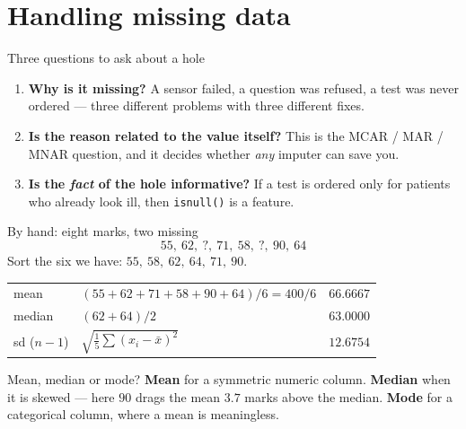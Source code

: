 \documentclass[aspectratio=169]{beamer}
\begin{document}
\section[Missing]{Handling missing data}
\label{sec:missing}

\begin{frame}[shrink=6]{Three questions to ask about a hole}
  \begin{enumerate}
    \item<1-> \textbf{Why is it missing?} A sensor failed, a question was
      refused, a test was never ordered --- three different problems with
      three different fixes.
    \item<2-> \textbf{Is the reason related to the value itself?} This is the
      MCAR / MAR / MNAR question, and it decides whether \emph{any} imputer
      can save you.
    \item<3-> \textbf{Is the \emph{fact} of the hole informative?} If a test
      is ordered only for patients who already look ill, then
      \texttt{isnull()} is a feature.
  \end{enumerate}
  \vspace{0.6em}
\end{frame}

\begin{frame}[shrink=8]{By hand: eight marks, two missing}
  \[
    55,\ 62,\ \boxed{?},\ 71,\ 58,\ \boxed{?},\ 90,\ 64
  \]
  Sort the six we have: $55,\ 58,\ 62,\ 64,\ 71,\ 90$.
  \begin{center}\small
  \begin{tabular}{@{}llr@{}}
    \toprule
    mean   & $(55+62+71+58+90+64)/6 = 400/6$ & $66.6667$\\
    median & $(62+64)/2$                     & $63.0000$\\
    sd ($n-1$) & $\sqrt{\frac{1}{5}\sum (x_i-\bar x)^2}$ & $12.6754$\\
    \bottomrule
  \end{tabular}
  \end{center}
  \vspace{0.3em}
  \begin{exampleblock}{Mean, median or mode?}
    \small \textbf{Mean} for a symmetric numeric column. \textbf{Median} when
    it is skewed --- here $90$ drags the mean $3.7$ marks above the median.
    \textbf{Mode} for a categorical column, where a mean is meaningless.
  \end{exampleblock}
\end{frame}
\end{document}
